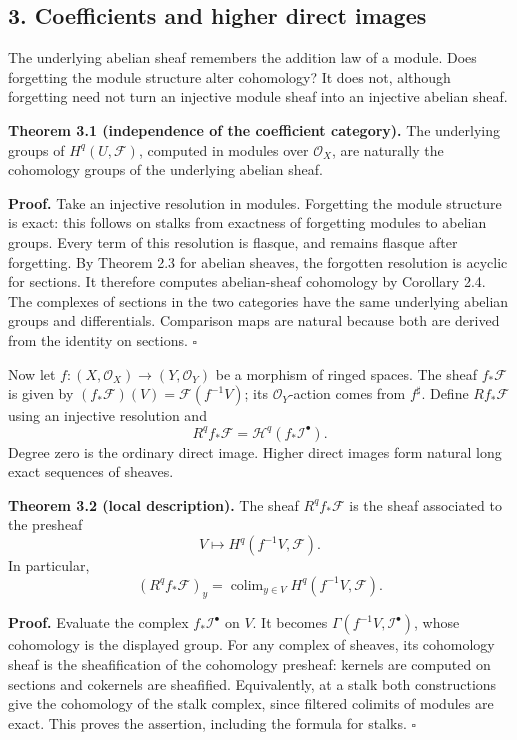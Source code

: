 \documentclass[11pt]{article}
\begin{document}
\subsection{3. Coefficients and higher direct
images}\label{coefficients-and-higher-direct-images}

The underlying abelian sheaf remembers the addition law of a module.
Does forgetting the module structure alter cohomology? It does not,
although forgetting need not turn an injective module sheaf into an
injective abelian sheaf.

\textbf{Theorem 3.1 (independence of the coefficient category).} The
underlying groups of \(H^q(U,\mathcal F)\), computed in modules over
\(\mathcal O_X\), are naturally the cohomology groups of the underlying
abelian sheaf.

\textbf{Proof.} Take an injective resolution in modules. Forgetting the
module structure is exact: this follows on stalks from exactness of
forgetting modules to abelian groups. Every term of this resolution is
flasque, and remains flasque after forgetting. By Theorem 2.3 for
abelian sheaves, the forgotten resolution is acyclic for sections. It
therefore computes abelian-sheaf cohomology by Corollary 2.4. The
complexes of sections in the two categories have the same underlying
abelian groups and differentials. Comparison maps are natural because
both are derived from the identity on sections. \(\square\)

Now let \(f:(X,\mathcal O_X)\to(Y,\mathcal O_Y)\) be a morphism of
ringed spaces. The sheaf \(f_*\mathcal F\) is given by
\((f_*\mathcal F)(V)=\mathcal F(f^{-1}V)\); its \(\mathcal O_Y\)-action
comes from \(f^\sharp\). Define \(Rf_*\mathcal F\) using an injective
resolution and \[
R^qf_*\mathcal F=\mathcal H^q(f_*\mathcal I^\bullet).
\] Degree zero is the ordinary direct image. Higher direct images form
natural long exact sequences of sheaves.

\textbf{Theorem 3.2 (local description).} The sheaf \(R^qf_*\mathcal F\)
is the sheaf associated to the presheaf \[
V\longmapsto H^q(f^{-1}V,\mathcal F).
\] In particular, \[
(R^qf_*\mathcal F)_y
=\mathop{\mathrm{colim}}_{y\in V}H^q(f^{-1}V,\mathcal F).
\]

\textbf{Proof.} Evaluate the complex \(f_*\mathcal I^\bullet\) on \(V\).
It becomes \(\Gamma(f^{-1}V,\mathcal I^\bullet)\), whose cohomology is
the displayed group. For any complex of sheaves, its cohomology sheaf is
the sheafification of the cohomology presheaf: kernels are computed on
sections and cokernels are sheafified. Equivalently, at a stalk both
constructions give the cohomology of the stalk complex, since filtered
colimits of modules are exact. This proves the assertion, including the
formula for stalks. \(\square\)
\end{document}
